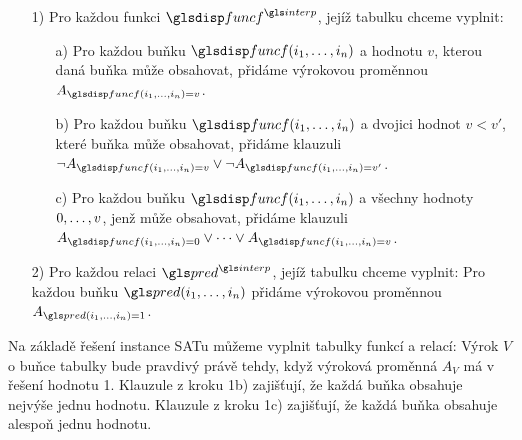 \begin{itemize}
\item[1)] Pro každou funkci $\func^\interp$, jejíž tabulku chceme vyplnit:
  \begin{itemize}
  \item[a)] Pro každou buňku $\func(i_1 \comdots i_n)$ a hodnotu $v$,
    kterou daná buňka může obsahovat, přidáme výrokovou proměnnou
    $A_{\func(i_1 \comdots i_n) = v}$.
  \item[b)] Pro každou buňku $\func(i_1 \comdots i_n)$
    a dvojici hodnot $v < v'$,
    které buňka může obsahovat, přidáme klauzuli
    $\neg A_{\func(i_1 \comdots i_n) = v} \vee \neg A_{\func(i_1 \comdots i_n) = v'}$.
  \item[c)] Pro každou buňku $\func(i_1 \comdots i_n)$ a všechny hodnoty
    $0 , \ldots, v$, jenž může obsahovat, přidáme klauzuli
    $A_{\func(i_1 \comdots i_n) = 0} \vee \cdots \vee A_{\func(i_1 \comdots i_n) = v}$.
  \end{itemize}
\item[2)] Pro každou relaci $\pred^\interp$, jejíž tabulku chceme vyplnit: Pro
  každou buňku $\pred(i_1 \comdots i_n)$ přidáme výrokovou proměnnou
  $A_{\pred(i_1 \comdots i_n) = 1}$.
\end{itemize}

Na základě řešení instance SATu můžeme vyplnit tabulky funkcí a relací:
Výrok $V$ o buňce tabulky bude pravdivý právě tehdy,
když výroková proměnná $A_V$ má v řešení hodnotu 1.
Klauzule z kroku 1b) zajišťují, že každá buňka obsahuje
nejvýše jednu hodnotu. Klauzule z kroku 1c) zajišťují, že každá
buňka obsahuje alespoň jednu hodnotu.

